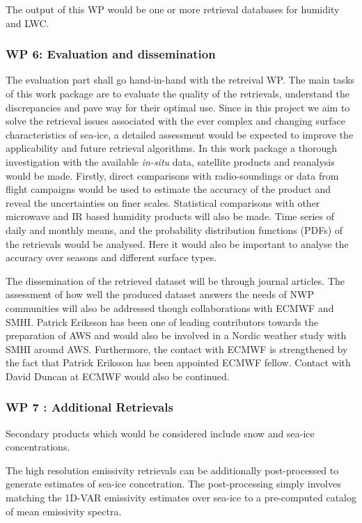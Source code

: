 \documentclass[12pt,oneside,a4paper]{article}
\begin{document}
The output of this WP would be one or more retrieval databases for humidity and LWC.

\subsubsection*{WP 6: Evaluation and dissemination}
%
\label{sec:evaluation}
The evaluation part shall go hand-in-hand with the retreival WP. The main tasks of this work package are to evaluate the quality of the retrievals, understand the discrepancies and pave way for their optimal use. Since in this project we aim to solve the retrieval issues associated with the ever complex and changing surface characteristics of sea-ice, a detailed assessment would be expected to improve the applicability and future retrieval algorithms. In this work package a thorough investigation with the available \textit{in-situ} data, satellite products and reanalysis would be made. Firstly, direct comparisons with radio-soundings or data from flight campaigns would be used to estimate the accuracy of the product and reveal the uncertainties on finer scales.  Statistical comparisons with other microwave and IR based humidity products  will also be made. Time series of daily and monthly means, and the probability distribution functions (PDFs) of the retrievals would be analysed. Here it would also be important to analyse the accuracy over seasons and different surface types. 

The dissemination of the retrieved dataset will be through journal articles. The assessment of how well the produced dataset answers the needs of NWP communities will also be addressed though collaborations with ECMWF and SMHI. Patrick Eriksson has been one of leading contributors towards the preparation of AWS and would also be involved in a Nordic weather study with SMHI around AWS. Furthermore, the contact with ECMWF is strengthened by the fact that Patrick Eriksson has been appointed ECMWF fellow. Contact with David Duncan at ECMWF would also be continued. 

\subsubsection*{WP 7 : Additional Retrievals}
%
\label{sec:other_retrievals}

Secondary products which would be considered include snow and sea-ice concentrations.  



The high resolution emissivity retrievals can be additionally post-processed to generate estimates of sea-ice concetration. The post-processing simply involves matching the 1D-VAR emissivity estimates over sea-ice to a pre-computed catalog of mean emissivity spectra. 
\end{document}
